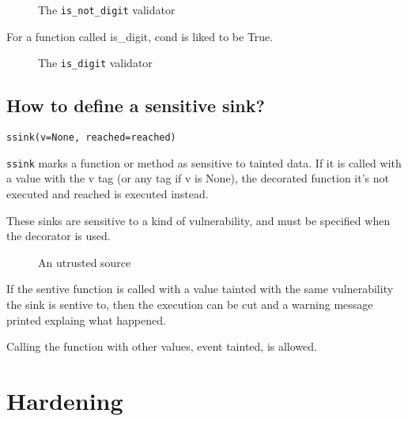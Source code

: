 \begin{figure}[t]
{\small{
\begin{minipage}[t]{0.5\linewidth}
 
\end{minipage}
\caption{\label{fig:cleaner1}The \texttt{is\_not\_digit} validator}
}}
\end{figure}

For a function called is\_digit, cond is liked to be True.

\begin{figure}[t]
{\small{
\begin{minipage}[t]{0.5\linewidth}
 
\end{minipage}
\caption{\label{fig:cleaner1}The \texttt{is\_digit} validator}
}}
\end{figure}

\subsection*{How to define a sensitive sink?}

\texttt{ssink(v=None, reached=reached)}

\texttt{ssink} marks a function or method as sensitive to tainted data.
If it is called with a value with the v tag (or any tag if v is None),
the decorated function it's not executed and reached is executed instead.

These sinks are sensitive to a kind of vulnerability, and must be specified when
the decorator is used.

\begin{figure}[t]
{\small{
\begin{minipage}[t]{0.5\linewidth}
 
\end{minipage}
\caption{\label{fig:untrusted}An utrusted source}
}}
\end{figure}

If the sentive function is called with a value tainted with the same vulnerability the sink is
sentive to, then the execution can be cut and a warning message printed explaing what happened.

Calling the function with other values, event tainted, is allowed.

\section{Hardening \suggestions}
\label{sec:securing}

